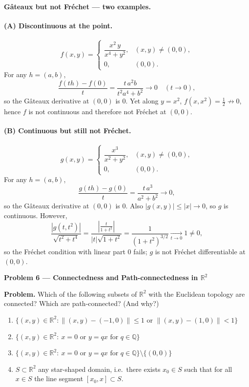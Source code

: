 \documentclass[12pt,a4paper]{article}
\theoremstyle{plain}
\theoremstyle{definition}
\theoremstyle{remark}
\theoremstyle{remark}
\newcommand{\probheader}[1]{%
	\par\vspace{8pt}%
	{\Large\bfseries #1\par}%
	\vspace{6pt}%
}
\begin{document}
	\textbf{G\^ateaux but not Fr\'echet — two examples.}
	
	\paragraph{(A) Discontinuous at the point.}
	\[
	f(x,y)=
	\begin{cases}
		\dfrac{x^2\,y}{x^4+y^2}, & (x,y)\neq(0,0),\\[6pt]
		0, & (0,0).
	\end{cases}
	\]
	For any $h=(a,b)$,
	\[
	\frac{f(th)-f(0)}{t}=\frac{t\,a^2 b}{t^2 a^4+b^2}\to 0\quad(t\to 0),
	\]
	so the G\^ateaux derivative at $(0,0)$ is $0$. Yet along $y=x^2$,
	$f(x,x^2)=\tfrac12\not\to 0$, hence $f$ is not continuous and therefore not Fr\'echet at $(0,0)$.
	
	\paragraph{(B) Continuous but still not Fr\'echet.}
	\[
	g(x,y)=
	\begin{cases}
		\dfrac{x^{3}}{x^{2}+y^{2}}, & (x,y)\neq(0,0),\\[6pt]
		0, & (0,0).
	\end{cases}
	\]
	For any $h=(a,b)$,
	\[
	\frac{g(th)-g(0)}{t}=\frac{t\,a^3}{a^2+b^2}\to 0,
	\]
	so the G\^ateaux derivative at $(0,0)$ is $0$. Also $|g(x,y)|\le |x|\to 0$, so $g$ is continuous.
	However,
	\[
	\frac{|g(t,t^2)|}{\sqrt{t^2+t^4}}
	=\frac{\left|\frac{t}{1+t^2}\right|}{|t|\sqrt{1+t^2}}
	=\frac{1}{(1+t^2)^{3/2}}\xrightarrow[t\to 0]{}1\neq 0,
	\]
	so the Fr\'echet condition with linear part $0$ fails; $g$ is not Fr\'echet differentiable at $(0,0)$.
	
	\probheader{Problem 6 — Connectedness and Path-connectedness in $\mathbb{R}^2$}
	
	\textbf{Problem.}
	Which of the following subsets of $\mathbb{R}^2$ with the Euclidean topology are connected?
	Which are path-connected? (And why?)
	
	\begin{enumerate}[label=(\alph*), leftmargin=1.2cm]
		\item $\{(x,y)\in\mathbb{R}^2:\|(x,y)-(-1,0)\|\le1
		\text{ or }\|(x,y)-(1,0)\|<1\}$
		
		\item $\{(x,y)\in\mathbb{R}^2:\ x=0
		\text{ or }y=qx\text{ for }q\in\mathbb{Q}\}$
		
		\item $\{(x,y)\in\mathbb{R}^2:\ x=0
		\text{ or }y=qx\text{ for }q\in\mathbb{Q}\}\setminus\{(0,0)\}$
		
		\item $S\subset\mathbb{R}^2$ any star-shaped domain,
		i.e.\ there exists $x_0\in S$ such that for all $x\in S$
		the line segment $[x_0,x]\subset S$.
	\end{enumerate}
	
\end{document}
